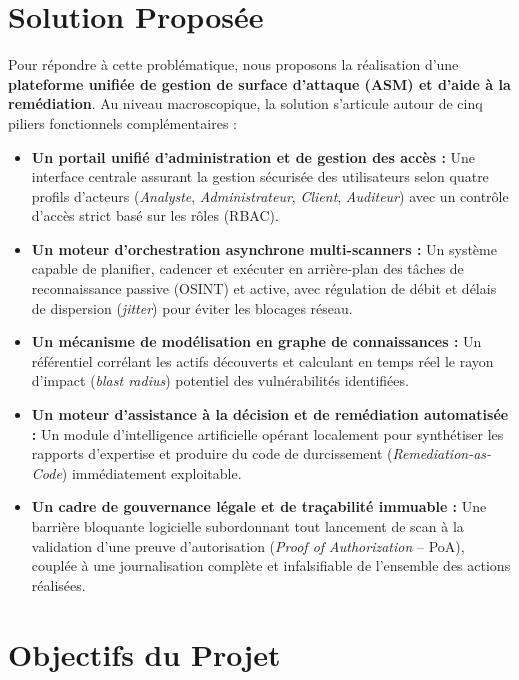 \section{Solution Propos\'ee}
\par Pour r\'epondre \`a cette probl\'ematique, nous proposons la r\'ealisation d'une \textbf{plateforme unifi\'ee de gestion de surface d'attaque (ASM) et d'aide \`a la rem\'ediation}. Au niveau macroscopique, la solution s'articule autour de cinq piliers fonctionnels compl\'ementaires :
\begin{itemize}
    \item \textbf{Un portail unifi\'e d'administration et de gestion des acc\`es :} Une interface centrale assurant la gestion s\'ecuris\'ee des utilisateurs selon quatre profils d'acteurs (\textit{Analyste}, \textit{Administrateur}, \textit{Client}, \textit{Auditeur}) avec un contr\^ole d'acc\`es strict bas\'e sur les r\^oles (RBAC).
    \item \textbf{Un moteur d'orchestration asynchrone multi-scanners :} Un syst\`eme capable de planifier, cadencer et ex\'ecuter en arri\`ere-plan des t\^aches de reconnaissance passive (OSINT) et active, avec r\'egulation de d\'ebit et d\'elais de dispersion (\textit{jitter}) pour \'eviter les blocages r\'eseau.
    \item \textbf{Un m\'ecanisme de mod\'elisation en graphe de connaissances :} Un r\'ef\'erentiel corr\'elant les actifs d\'ecouverts et calculant en temps r\'eel le rayon d'impact (\textit{blast radius}) potentiel des vuln\'erabilit\'es identifi\'ees.
    \item \textbf{Un moteur d'assistance \`a la d\'ecision et de rem\'ediation automatis\'ee :} Un module d'intelligence artificielle op\'erant localement pour synth\'etiser les rapports d'expertise et produire du code de durcissement (\textit{Remediation-as-Code}) imm\'ediatement exploitable.
    \item \textbf{Un cadre de gouvernance l\'egale et de tra\c{c}abilit\'e immuable :} Une barri\`ere bloquante logicielle subordonnant tout lancement de scan \`a la validation d'une preuve d'autorisation (\textit{Proof of Authorization} -- PoA), coupl\'ee \`a une journalisation compl\`ete et infalsifiable de l'ensemble des actions r\'ealis\'ees.
\end{itemize}

\section{Objectifs du Projet}
